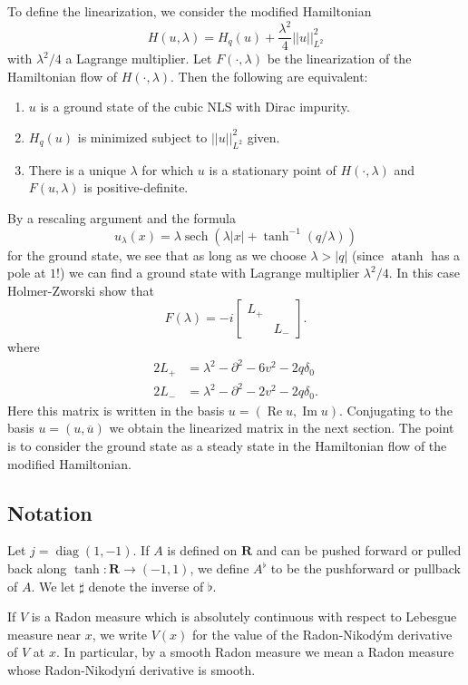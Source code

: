 \documentclass[reqno,12pt,letterpaper]{amsart}
\newcommand{\RR}{\mathbf{R}}
\DeclareMathOperator{\diag}{diag}
\DeclareMathOperator{\atanh}{atanh}
\DeclareMathOperator{\sech}{sech}
\renewcommand{\Re}{\operatorname{Re}}
\renewcommand{\Im}{\operatorname{Im}}
\theoremstyle{definition}
\begin{document}
To define the linearization, we consider the modified Hamiltonian
$$H(u, \lambda) = H_q(u) + \frac{\lambda^2}{4} ||u||_{L^2}^2$$
with $\lambda^2/4$ a Lagrange multiplier. Let $F(\cdot, \lambda)$ be the linearization of the Hamiltonian flow of $H(\cdot, \lambda)$. Then the following are equivalent:
\begin{enumerate}
\item $u$ is a ground state of the cubic NLS with Dirac impurity.
\item $H_q(u)$ is minimized subject to $||u||_{L^2}^2$ given.
\item There is a unique $\lambda$ for which $u$ is a stationary point of $H(\cdot, \lambda)$ and $F(u, \lambda)$ is positive-definite.
\end{enumerate}
By a rescaling argument and the formula
$$u_\lambda(x) = \lambda \sech(\lambda|x| + \tanh^{-1}(q/\lambda))$$
for the ground state, we see that as long as we choose $\lambda > |q|$ (since $\atanh$ has a pole at $1$!) we can find a ground state with Lagrange multiplier $\lambda^2/4$.
In this case Holmer-Zworski show that
$$F(\lambda) = -i\begin{bmatrix}L_+ \\ & L_-\end{bmatrix}.$$
where
\begin{align*}
2L_+ &= \lambda^2 - \partial^2 - 6v^2 - 2q\delta_0\\
2L_- &= \lambda^2 - \partial^2 - 2v^2 - 2q\delta_0.
\end{align*}
Here this matrix is written in the basis $u = (\Re u, \Im u)$. Conjugating to the basis $u = (u, \overline u)$ we obtain the linearized matrix in the next section.
The point is to consider the ground state as a steady state in the Hamiltonian flow of the modified Hamiltonian.

\subsection{Notation}
Let $j = \diag(1, -1)$. If $A$ is defined on $\RR$ and can be pushed forward or pulled back along $\tanh: \RR \to (-1, 1)$, we define $A^\flat$ to be the pushforward or pullback of $A$.
We let $\sharp$ denote the inverse of $\flat$.

If $V$ is a Radon measure which is absolutely continuous with respect to Lebesgue measure near $x$, we write $V(x)$ for the value of the Radon-Nikod\'ym derivative of $V$ at $x$.
In particular, by a smooth Radon measure we mean a Radon measure whose Radon-Nikody\'m derivative is smooth.
\end{document}

